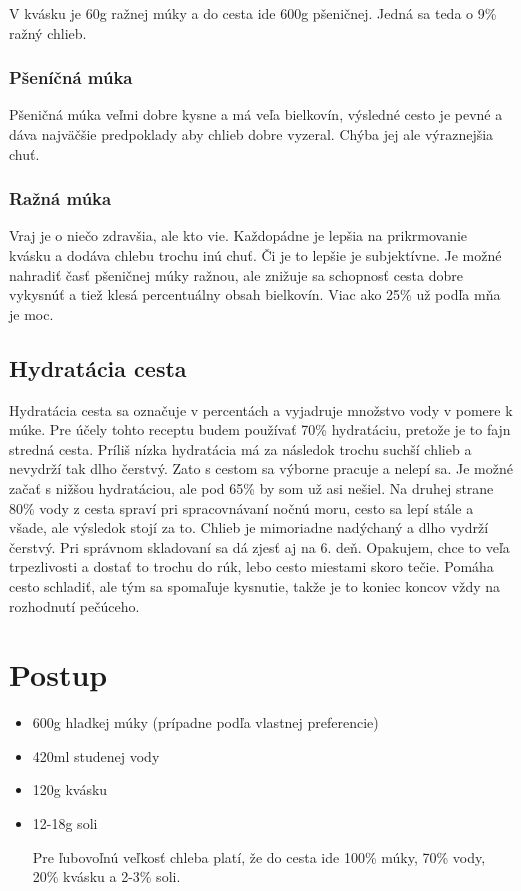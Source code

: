 \documentclass[a4paper,12pt]{article}
\begin{document}
V kvásku je 60g ražnej múky a do cesta ide 600g pšeničnej. Jedná sa teda o 9\% ražný chlieb.


\subsubsection{Pšeníčná múka}
Pšeničná múka veľmi dobre kysne a má veľa bielkovín, výsledné cesto je pevné a dáva najväčšie predpoklady aby chlieb dobre vyzeral. Chýba jej ale výraznejšia chuť.
\subsubsection{Ražná múka}
Vraj je o niečo zdravšia, ale kto vie. Každopádne je lepšia na prikrmovanie kvásku a dodáva chlebu trochu inú chuť. Či je to lepšie je subjektívne. Je možné  nahradiť časť pšeničnej múky ražnou, ale znižuje sa schopnosť cesta dobre vykysnúť a tiež klesá percentuálny obsah bielkovín. Viac ako 25\% už podľa mňa je moc.

\subsection{Hydratácia cesta}
Hydratácia cesta sa označuje v percentách a vyjadruje množstvo vody v pomere k múke. Pre účely tohto receptu budem používať 70\% hydratáciu, pretože je to fajn stredná cesta. Príliš nízka hydratácia má za následok trochu suchší chlieb a nevydrží tak dlho čerstvý. Zato s cestom sa výborne pracuje a nelepí sa. Je možné začať s nižšou hydratáciou, ale pod 65\% by som už asi nešiel. Na druhej strane 80\% vody z cesta spraví pri spracovnávaní nočnú moru, cesto sa lepí stále a všade, ale výsledok stojí za to. Chlieb je mimoriadne nadýchaný a dlho vydrží čerstvý. Pri správnom skladovaní sa dá zjesť aj na 6. deň. Opakujem, chce to veľa trpezlivosti a dostať to trochu do rúk, lebo cesto miestami skoro tečie. Pomáha cesto schladiť, ale tým sa spomaľuje kysnutie, takže je to koniec koncov vždy na rozhodnutí pečúceho.

\section{Postup}
\begin{tcolorbox}[colframe=blue!50!black, colback=blue!5!white, title=Ingrediencie]
    \begin{itemize}
        \item 600g hladkej múky (prípadne podľa vlastnej preferencie)
        \item 420ml studenej vody
        \item 120g kvásku
        \item 12-18g soli

        Pre ľubovoľnú veľkosť chleba platí, že do cesta ide 100\% múky, 70\% vody, 20\% kvásku a  2-3\% soli.
    \end{itemize}
\end{tcolorbox}
\end{document}
